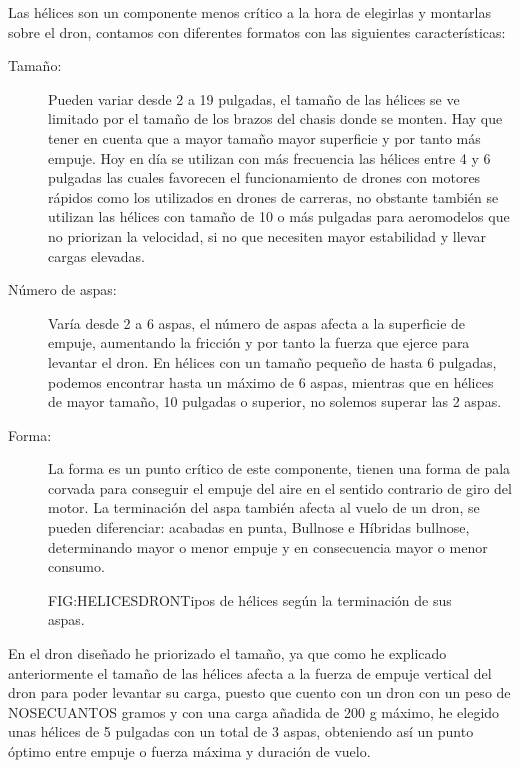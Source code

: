 
 Las hélices son un componente menos crítico a la hora de elegirlas y montarlas sobre el dron, contamos con diferentes formatos con las siguientes características:
 \begin{description}
        \item[Tamaño:] Pueden variar desde 2 a 19 pulgadas, el tamaño de las hélices se ve limitado por el tamaño de los brazos del chasis donde se monten. Hay que tener en cuenta que a mayor tamaño mayor superficie y por tanto más empuje. Hoy en día se utilizan con más frecuencia las hélices entre 4 y 6 pulgadas las cuales favorecen el funcionamiento de drones con motores rápidos como los utilizados en drones de carreras, no obstante también se utilizan las hélices con tamaño de 10 o más pulgadas para aeromodelos que no priorizan la velocidad, si no que necesiten mayor estabilidad y llevar cargas elevadas.
 		\item[Número de aspas:] Varía desde 2 a 6 aspas, el número de aspas afecta a la superficie de empuje, aumentando la fricción y por tanto la fuerza que ejerce para levantar el dron. En hélices con un  tamaño pequeño de hasta 6 pulgadas, podemos encontrar hasta un máximo de 6 aspas, mientras que en hélices de mayor tamaño, 10 pulgadas o superior, no solemos superar las 2 aspas.
 		\item[Forma:] La forma es un punto crítico de este componente, tienen una forma de pala corvada para conseguir el empuje del aire en el sentido contrario de giro del motor. La terminación del aspa también afecta al vuelo de un dron, se pueden diferenciar: acabadas en punta,  Bullnose e Híbridas bullnose, determinando mayor o menor empuje y en consecuencia mayor o menor consumo.

 
 \end{description}
 
 \begin{figure}[Helices dron]{FIG:HELICESDRON}{Tipos de hélices según  la terminación de sus aspas.}
   \quad
   \quad
\end{figure} 

 
 En el dron diseñado he priorizado el tamaño, ya que como he explicado anteriormente el tamaño de las hélices afecta a la fuerza de empuje vertical del dron para poder levantar su carga, puesto que cuento con un dron con un peso de NOSECUANTOS gramos y con una carga añadida de 200 g máximo, he elegido unas hélices de 5 pulgadas con un total de 3 aspas, obteniendo así un punto óptimo entre empuje o fuerza máxima y duración de vuelo.
 

 